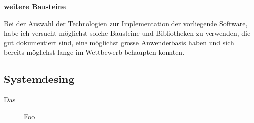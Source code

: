 \documentclass[a4paper]{thesis}
\begin{document}
\textbf{weitere Bausteine}

Bei der Auswahl der Technologien zur
Implementation der vorliegende Software,
habe ich versucht möglichst solche Bausteine und Bibliotheken
zu verwenden, die gut dokumentiert sind, eine möglichst grosse Anwenderbasis
haben und sich bereits möglichst lange im Wettbewerb behaupten konnten.

\subsection{Systemdesing}

Das 

\begin{figure}[h]\centering
{}
\caption[Domai nModel]{
	Foo
}
\label{fig:domainmodel}
\end{figure}
\end{document}

